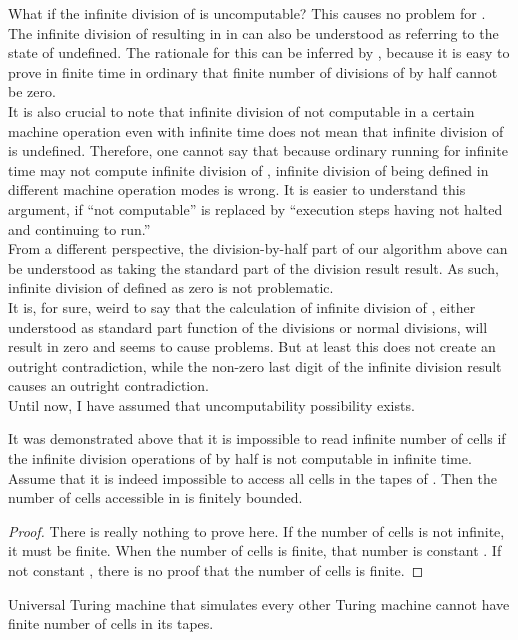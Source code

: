 \documentclass{roffin}
\begin{document}
What if the infinite division of  is uncomputable? This causes no problem for . The infinite division of  resulting in  in  can also be understood as  referring to the state of undefined. The rationale for this can be inferred by , because it is easy to prove in finite time in ordinary  that finite number of divisions of  by half cannot be zero.\\
It is also crucial to note that infinite division of  not computable in a certain machine operation even with infinite time does not mean that infinite division of  is undefined. Therefore, one cannot say that because ordinary  running for infinite time may not compute infinite division of , infinite division of  being defined in different machine operation modes is wrong. It is easier to understand this argument, if ``not computable'' is replaced by ``execution steps having not halted and continuing to run.''\\
From a different perspective, the division-by-half part of our  algorithm above can be understood as taking the standard part of the division result result. As such, infinite division of  defined as zero is not problematic.\\
It is, for sure, weird to say that the calculation of infinite division of , either understood as standard part function of the divisions or normal divisions, will result in zero and seems to cause problems. But at least this does not create an outright contradiction, while the non-zero last digit of the infinite division result causes an outright contradiction.\\
Until now, I have assumed that uncomputability possibility exists.
\begin{proposition}
It was demonstrated above that it is impossible to read infinite number of cells if the infinite division operations of  by half is not computable in infinite time. Assume that it is indeed impossible to access all cells in the tapes of . Then the number of cells accessible in  is finitely bounded.   
\end{proposition}
\begin{proof}
There is really nothing to prove here. If the number of cells is not infinite, it must be finite. When the number of cells is finite, that number is constant . If not constant , there is no proof that the number of cells is finite.
\end{proof}
\begin{proposition}
Universal Turing machine that simulates every other Turing machine cannot have finite number of cells in its tapes. 
\end{proposition}
\end{document}

